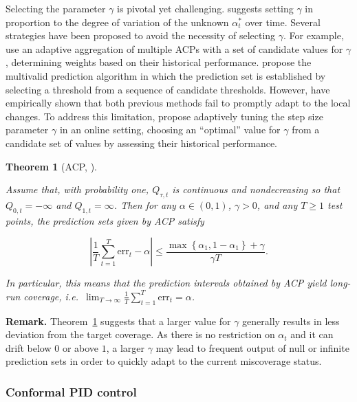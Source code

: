 \documentclass[
  11pt,
  a4paper,
]{article}
\theoremstyle{plain}
\newtheorem{theorem}{Theorem}[section]
\theoremstyle{plain}
\theoremstyle{remark}
\begin{document}
Selecting the parameter \(\gamma\) is pivotal yet challenging.
\textcite{gibbs2021} suggests setting \(\gamma\) in proportion to the
degree of variation of the unknown \(\alpha_{t}^{*}\) over time. Several
strategies have been proposed to avoid the necessity of selecting
\(\gamma\). For example, \textcite{zaffran2022} use an adaptive
aggregation of multiple ACPs with a set of candidate values for
\(\gamma\) , determining weights based on their historical performance.
\textcite{bastani2022} propose the multivalid prediction algorithm in
which the prediction set is established by selecting a threshold from a
sequence of candidate thresholds. However, \textcite{gibbs2022} have
empirically shown that both previous methods fail to promptly adapt to
the local changes. To address this limitation, \textcite{gibbs2022}
propose adaptively tuning the step size parameter \(\gamma\) in an
online setting, choosing an ``optimal'' value for \(\gamma\) from a
candidate set of values by assessing their historical performance.

\begin{theorem}[ACP,
\textcite{gibbs2021}]\protect\hypertarget{thm-acp}{}\label{thm-acp}

Assume that, with probability one, \(Q_{\tau, t}\) is continuous and
nondecreasing so that \(Q_{0, t}=-\infty\) and \(Q_{1, t}=\infty\). Then
for any \(\alpha\in(0,1)\), \(\gamma > 0\), and any \(T \geq 1\) test
points, the prediction sets given by ACP satisfy

\[
|\frac{1}{T}\sum_{t=1}^{T}\mathrm{err}_t - \alpha| \leq \frac{\max\left\{\alpha_1,1-\alpha_1\right\}+\gamma}{\gamma T}.
\]

In particular, this means that the prediction intervals obtained by ACP
yield long-run coverage,
i.e.~\(\lim _{T \rightarrow \infty} \frac{1}{T} \sum_{t=1}^T \mathrm{err}_t = \alpha\).

\end{theorem}

\textbf{Remark.} Theorem~\ref{thm-acp} suggests that a larger value for
\(\gamma\) generally results in less deviation from the target coverage.
As there is no restriction on \(\alpha_t\) and it can drift below \(0\)
or above \(1\), a larger \(\gamma\) may lead to frequent output of null
or infinite prediction sets in order to quickly adapt to the current
miscoverage status.

\subsubsection{Conformal PID control}\label{conformal-pid-control}
\end{document}
